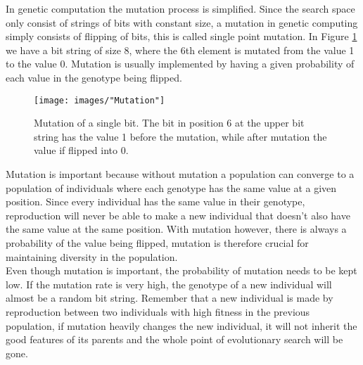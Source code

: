 \noindent In genetic computation the mutation process is simplified. Since the search space only consist of strings of bits with constant size, a mutation in genetic computing simply consists of flipping of bits, this is called single point mutation. In Figure \ref{Mutation} we have a bit string of size 8, where the 6th element is mutated from the value 1 to the value 0. Mutation is usually implemented by having a given probability of each value in the genotype being flipped.


\begin{figure}[h!]
\begin{center}
\texttt{[image: images/"Mutation"]}
\caption{Mutation of a single bit. The bit in position 6 at the upper bit string has the value 1 before the mutation, while after mutation the value if flipped into 0.}
\label{Mutation}
\end{center}
\end{figure}


Mutation is important because without mutation a population can converge to a population of individuals where each genotype has the same value at a given position. Since every individual has the same value in their genotype, reproduction will never be able to make a new individual that doesn't also have the same value at the same position. With mutation however, there is always a probability of the value being flipped, mutation is therefore crucial for maintaining diversity in the population.\\


\noindent Even though mutation is important, the probability of mutation needs to be kept low. If the mutation rate is very high, the genotype of a new individual will almost be a random bit string. Remember that a new individual is made by reproduction between two individuals with high fitness in the previous population, if mutation heavily changes the new individual, it will not inherit the good features of its parents and the whole point of evolutionary search will be gone.


